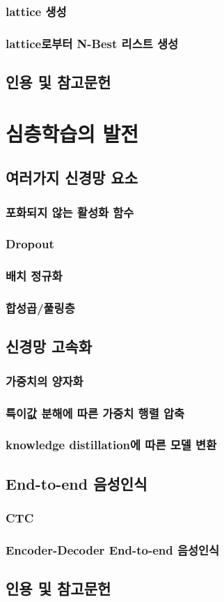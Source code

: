 \documentclass{book}
\begin{document}
\subsection{lattice 생성}
\subsection{lattice로부터 N-Best 리스트 생성}

\section*{인용 및 참고문헌}

\chapter{심층학습의 발전}
\section{여러가지 신경망 요소}
\subsection{포화되지 않는 활성화 함수}
\subsection{Dropout}
\subsection{배치 정규화}
\subsection{합성곱/풀링층}

\section{신경망 고속화}
\subsection{가중치의 양자화}
\subsection{특이값 분해에 따른 가중치 행렬 압축}
\subsection{knowledge distillation에 따른 모델 변환}

\section{End-to-end 음성인식}
\subsection{CTC}
\subsection{Encoder-Decoder End-to-end 음성인식}

\section*{인용 및 참고문헌}
\end{document}

